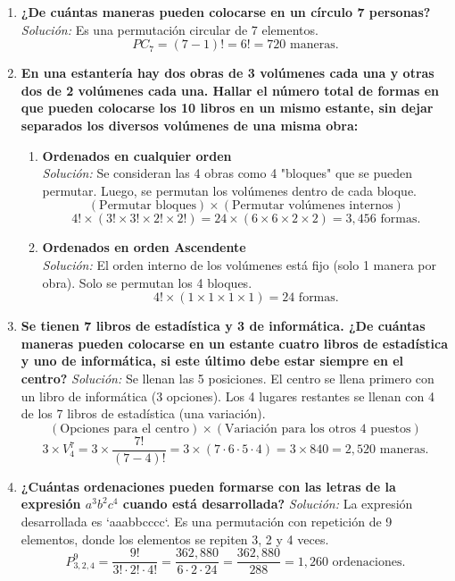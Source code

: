 \documentclass[12pt, letterpaper]{article}
\begin{document}
\begin{enumerate}
    \item \textbf{¿De cuántas maneras pueden colocarse en un círculo 7 personas?}
        \textit{Solución:} Es una permutación circular de 7 elementos.
        \[ PC_7 = (7-1)! = 6! = 720 \text{ maneras.} \]

    \item \textbf{En una estantería hay dos obras de 3 volúmenes cada una y otras dos de 2 volúmenes cada una. Hallar el número total de formas en que pueden colocarse los 10 libros en un mismo estante, sin dejar separados los diversos volúmenes de una misma obra:}
        \begin{enumerate}
            \item \textbf{Ordenados en cualquier orden} \\
                \textit{Solución:} Se consideran las 4 obras como 4 "bloques" que se pueden permutar. Luego, se permutan los volúmenes dentro de cada bloque.
                \[ (\text{Permutar bloques}) \times (\text{Permutar volúmenes internos}) \]
                \[ 4! \times (3! \times 3! \times 2! \times 2!) = 24 \times (6 \times 6 \times 2 \times 2) = 3,456 \text{ formas.} \]
            \item \textbf{Ordenados en orden Ascendente} \\
                \textit{Solución:} El orden interno de los volúmenes está fijo (solo 1 manera por obra). Solo se permutan los 4 bloques.
                \[ 4! \times (1 \times 1 \times 1 \times 1) = 24 \text{ formas.} \]
        \end{enumerate}

    \item \textbf{Se tienen 7 libros de estadística y 3 de informática. ¿De cuántas maneras pueden colocarse en un estante cuatro libros de estadística y uno de informática, si este último debe estar siempre en el centro?}
        \textit{Solución:} Se llenan las 5 posiciones. El centro se llena primero con un libro de informática (3 opciones). Los 4 lugares restantes se llenan con 4 de los 7 libros de estadística (una variación).
        \[ (\text{Opciones para el centro}) \times (\text{Variación para los otros 4 puestos}) \]
        \[ 3 \times V_4^7 = 3 \times \frac{7!}{(7-4)!} = 3 \times (7 \cdot 6 \cdot 5 \cdot 4) = 3 \times 840 = 2,520 \text{ maneras.} \]

    \item \textbf{¿Cuántas ordenaciones pueden formarse con las letras de la expresión \texorpdfstring{$a^3b^2c^4$}{a3b2c4} cuando está desarrollada?}
        \textit{Solución:} La expresión desarrollada es `aaabbcccc`. Es una permutación con repetición de 9 elementos, donde los elementos se repiten 3, 2 y 4 veces.
        \[ P_{3,2,4}^{9} = \frac{9!}{3! \cdot 2! \cdot 4!} = \frac{362,880}{6 \cdot 2 \cdot 24} = \frac{362,880}{288} = 1,260 \text{ ordenaciones.} \]
\end{enumerate}
\newpage
\end{document}
